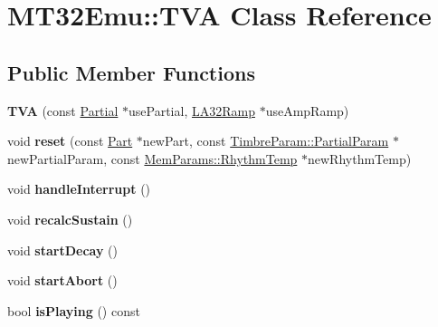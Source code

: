 \hypertarget{classMT32Emu_1_1TVA}{\section{M\-T32\-Emu\-:\-:T\-V\-A Class Reference}
\label{classMT32Emu_1_1TVA}
}
\subsection*{Public Member Functions}
\begin{DoxyCompactItemize}
\item 
\hypertarget{classMT32Emu_1_1TVA_a7e2427ea92fa249286b2b2dab38afc0e}{{\bfseries T\-V\-A} (const \hyperlink{classMT32Emu_1_1Partial}{Partial} $\ast$use\-Partial, \hyperlink{classMT32Emu_1_1LA32Ramp}{L\-A32\-Ramp} $\ast$use\-Amp\-Ramp)}\label{classMT32Emu_1_1TVA_a7e2427ea92fa249286b2b2dab38afc0e}

\item 
\hypertarget{classMT32Emu_1_1TVA_a30715ac3e077738ca131ff2de576d93b}{void {\bfseries reset} (const \hyperlink{classMT32Emu_1_1Part}{Part} $\ast$new\-Part, const \hyperlink{structMT32Emu_1_1TimbreParam_1_1PartialParam}{Timbre\-Param\-::\-Partial\-Param} $\ast$new\-Partial\-Param, const \hyperlink{structMT32Emu_1_1MemParams_1_1RhythmTemp}{Mem\-Params\-::\-Rhythm\-Temp} $\ast$new\-Rhythm\-Temp)}\label{classMT32Emu_1_1TVA_a30715ac3e077738ca131ff2de576d93b}

\item 
\hypertarget{classMT32Emu_1_1TVA_a43aadcdec12c477472206698da20b73b}{void {\bfseries handle\-Interrupt} ()}\label{classMT32Emu_1_1TVA_a43aadcdec12c477472206698da20b73b}

\item 
\hypertarget{classMT32Emu_1_1TVA_a882afffe8cd1962dc5780c3a8e9e6f90}{void {\bfseries recalc\-Sustain} ()}\label{classMT32Emu_1_1TVA_a882afffe8cd1962dc5780c3a8e9e6f90}

\item 
\hypertarget{classMT32Emu_1_1TVA_adeca59bbd23c5895071e1b9ed8b5adfd}{void {\bfseries start\-Decay} ()}\label{classMT32Emu_1_1TVA_adeca59bbd23c5895071e1b9ed8b5adfd}

\item 
\hypertarget{classMT32Emu_1_1TVA_a57b87f68c0afa488392c7e6835dcc845}{void {\bfseries start\-Abort} ()}\label{classMT32Emu_1_1TVA_a57b87f68c0afa488392c7e6835dcc845}

\item 
\hypertarget{classMT32Emu_1_1TVA_a07824c2ce5bbe74bc13e2ed488c82939}{bool {\bfseries is\-Playing} () const }\label{classMT32Emu_1_1TVA_a07824c2ce5bbe74bc13e2ed488c82939}


\end{DoxyCompactItemize}
